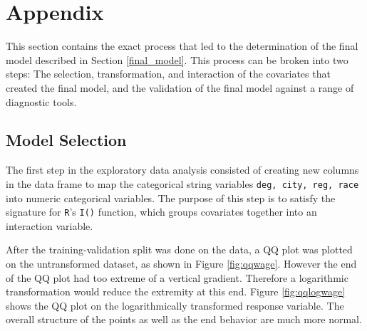 \documentclass{article}
\begin{document}
  \section{Appendix}
    This section contains the exact process that led to the determination of the final
    model described in Section \ref{final_model}. This process can be broken into two steps:
    The selection, transformation, and interaction of the covariates that created the
    final model, and the validation of the final model against a range of diagnostic tools.

    \subsection{Model Selection}
      The first step in the exploratory data analysis consisted of creating new columns in the
      data frame to map the categorical string variables \texttt{deg, city, reg, race} into
      numeric categorical variables. The purpose of this step is to satisfy the signature for \texttt{R}'s \texttt{I()}
      function, which groups covariates together into an interaction variable.

      After the training-validation split was done on the data, a QQ plot was plotted on
      the untransformed dataset, as shown in Figure \ref{fig:qqwage}. However the end
      of the QQ plot had too extreme of a vertical gradient. Therefore a logarithmic
      transformation would reduce the extremity at this end. Figure \ref{fig:qqlogwage}
      shows the QQ plot on the logarithmically transformed response variable. The
      overall structure of the points as well as the end behavior are much more
      normal.
\end{document}
